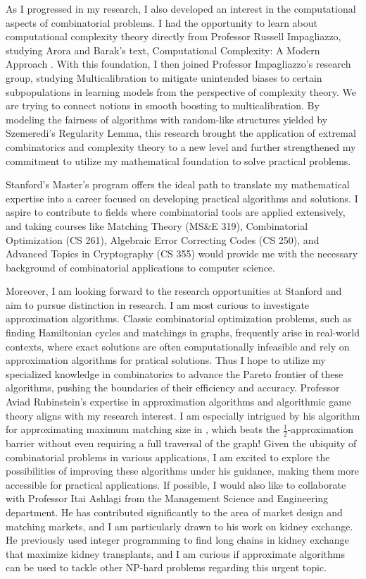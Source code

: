 \documentclass[12pt]{article}
\begin{document}
As I progressed in my research, I also developed an interest in the computational aspects of
combinatorial problems. I had the opportunity to learn about computational complexity theory
directly from Professor Russell Impagliazzo, studying Arora and Barak's text, Computational
Complexity: A Modern Approach \cite{arora2009computational}. With this foundation, I then joined
Professor Impagliazzo's research group, studying Multicalibration to mitigate unintended biases to
certain subpopulations in learning models from the perspective of complexity theory. We are trying
to connect notions in smooth boosting to multicalibration. By modeling the fairness of algorithms
with random-like structures yielded by Szemeredi's Regularity Lemma, this research brought the
application of extremal combinatorics and complexity theory to a new level and further strengthened
my commitment to utilize my mathematical foundation to solve practical problems.

Stanford's Master's program offers the ideal path to translate my mathematical expertise into a
career focused on developing practical algorithms and solutions. I aspire to contribute to fields
where combinatorial tools are applied extensively, and taking courses like Matching Theory (MS\&E
319), Combinatorial Optimization (CS 261), Algebraic Error Correcting Codes (CS 250), and Advanced
Topics in Cryptography (CS 355) would provide me with the necessary background of combinatorial
applications to computer science.

Moreover, I am looking forward to the research opportunities at Stanford and aim to pursue
distinction in research. I am most curious to investigate approximation algorithms. Classic
combinatorial optimization problems, such as finding Hamiltonian cycles and matchings in graphs,
frequently arise in real-world contexts, where exact solutions are often computationally infeasible
and rely on approximation algorithms for pratical solutions. Thus I hope to utilize my specialized
knowledge in combinatorics to advance the Pareto frontier of these algorithms, pushing the
boundaries of their efficiency and accuracy. Professor Aviad Rubinstein's expertise in approximation
algorithms and algorithmic game theory aligns with my research interest. I am especially intrigued
by his algorithm for approximating maximum matching size in
\cite{doi:10.1137/1.9781611977554.ch151}, which beats the $\frac{1}{2}$-approximation barrier
without even requiring a full traversal of the graph! Given the ubiquity of combinatorial problems
in various applications, I am excited to explore the possibilities of improving these algorithms
under his guidance, making them more accessible for practical applications. If possible, I would
also like to collaborate with Professor Itai Ashlagi from the Management Science and Engineering
department. He has contributed significantly to the area of market design and matching markets, and
I am particularly drawn to his work on kidney exchange. He previously used integer programming to
find long chains in kidney exchange that maximize kidney
transplants\cite{doi:10.1073/pnas.1421853112}, and I am curious if approximate algorithms can be
used to tackle other NP-hard problems regarding this urgent topic.
\end{document}
